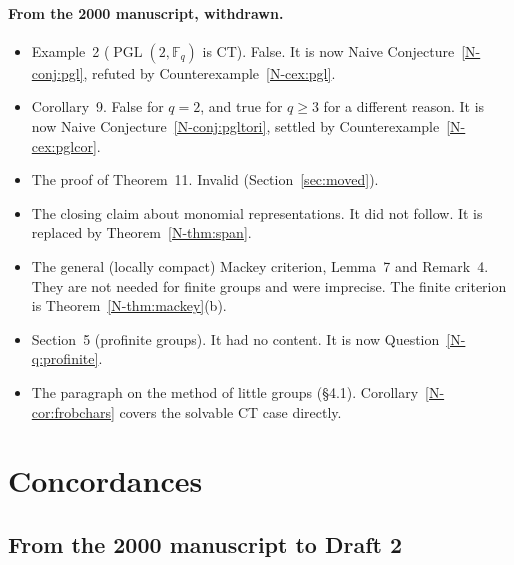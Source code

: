 \documentclass[12pt,letterpaper]{article}
\newcommand{\F}{\mathbb{F}}
\DeclareMathOperator{\PGL}{PGL}
\begin{document}
\paragraph{From the 2000 manuscript, withdrawn.}
\begin{itemize}[itemsep=1pt]
\item Example~2 ($\PGL(2,\F_q)$ is CT). False. It is now Naive
  Conjecture~\ref{N-conj:pgl}, refuted by
  Counterexample~\ref{N-cex:pgl}.
\item Corollary~9. False for $q=2$, and true for $q\ge3$ for a different
  reason. It is now Naive Conjecture~\ref{N-conj:pgltori}, settled by
  Counterexample~\ref{N-cex:pglcor}.
\item The proof of Theorem~11. Invalid (Section~\ref{sec:moved}).
\item The closing claim about monomial representations. It did not follow.
  It is replaced by Theorem~\ref{N-thm:span}.
\item The general (locally compact) Mackey criterion, Lemma~7 and Remark~4.
  They are not needed for finite groups and were imprecise. The finite
  criterion is Theorem~\ref{N-thm:mackey}(b).
\item Section~5 (profinite groups). It had no content. It is now
  Question~\ref{N-q:profinite}.
\item The paragraph on the method of little groups (\S4.1).
  Corollary~\ref{N-cor:frobchars} covers the solvable CT case directly.
\end{itemize}

\section{Concordances}\label{sec:concordance}

\subsection{From the 2000 manuscript to Draft 2}
\end{document}
